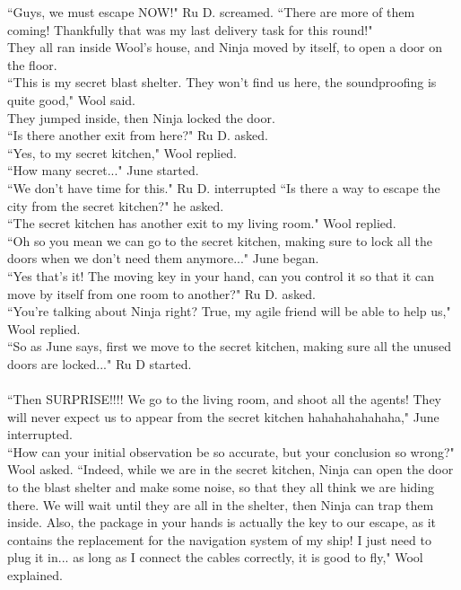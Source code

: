 ``Guys, we must escape NOW!" Ru D. screamed. ``There are more of them coming! Thankfully that was my last delivery task for this round!"\\
They all ran inside Wool's house, and Ninja moved by itself, to open a door on the floor.\\
``This is my secret blast shelter. They won't find us here, the soundproofing is quite good," Wool said.\\
They jumped inside, then Ninja locked the door.\\
``Is there another exit from here?" Ru D. asked.\\
``Yes, to my secret kitchen," Wool replied.\\
``How many secret..." June started.\\
``We don't have time for this." Ru D. interrupted ``Is there a way to escape the city from the secret kitchen?" he asked.\\
``The secret kitchen has another exit to my living room." Wool replied.\\
``Oh so you mean we can go to the secret kitchen, making sure to lock all the doors when we don't need them anymore..." June began.\\
``Yes that's it! The moving key in your hand, can you control it so that it can move by itself from one room to another?" Ru D. asked.\\
``You're talking about Ninja right? True, my agile friend will be able to help us," Wool replied.\\
``So as June says, first we move to the secret kitchen, making sure all the unused doors are locked..." Ru D started.\\\\
``Then SURPRISE!!!! We go to the living room, and shoot all the agents! They will never expect us to appear from the secret kitchen hahahahahahaha," June interrupted.\\
``How can your initial observation be so accurate, but your conclusion so wrong?" Wool asked. ``Indeed, while we are in the secret kitchen, Ninja can open the door to the blast shelter and make some noise, so that they all think we are hiding there. We will wait until they are all in the shelter, then Ninja can trap them inside. Also, the package in your hands is actually the key to our escape, as it contains the replacement for the navigation system of my ship! I just need to plug it in... as long as I connect the cables correctly, it is good to fly," Wool explained.\\
